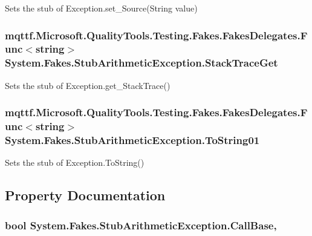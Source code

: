Sets the stub of Exception.\-set\-\_\-\-Source(\-String value)

\hypertarget{class_system_1_1_fakes_1_1_stub_arithmetic_exception_af51c42687be1226d34401b432826a1bf}{
\subsubsection[{Stack\-Trace\-Get}]{\setlength{\rightskip}{0pt plus 5cm}mqttf.\-Microsoft.\-Quality\-Tools.\-Testing.\-Fakes.\-Fakes\-Delegates.\-Func$<$string$>$ System.\-Fakes.\-Stub\-Arithmetic\-Exception.\-Stack\-Trace\-Get}}\label{class_system_1_1_fakes_1_1_stub_arithmetic_exception_af51c42687be1226d34401b432826a1bf}


Sets the stub of Exception.\-get\-\_\-\-Stack\-Trace()

\hypertarget{class_system_1_1_fakes_1_1_stub_arithmetic_exception_a7d74c548b9146bae99f26ce391132043}{
\subsubsection[{To\-String01}]{\setlength{\rightskip}{0pt plus 5cm}mqttf.\-Microsoft.\-Quality\-Tools.\-Testing.\-Fakes.\-Fakes\-Delegates.\-Func$<$string$>$ System.\-Fakes.\-Stub\-Arithmetic\-Exception.\-To\-String01}}\label{class_system_1_1_fakes_1_1_stub_arithmetic_exception_a7d74c548b9146bae99f26ce391132043}


Sets the stub of Exception.\-To\-String()



\subsection{Property Documentation}
\hypertarget{class_system_1_1_fakes_1_1_stub_arithmetic_exception_a3149e53aa5150b8806b6290e0621d1aa}{
\subsubsection[{Call\-Base}]{\setlength{\rightskip}{0pt plus 5cm}bool System.\-Fakes.\-Stub\-Arithmetic\-Exception.\-Call\-Base\hspace{0.3cm}{\ttfamily [get]}, {\ttfamily [set]}}}\label{class_system_1_1_fakes_1_1_stub_arithmetic_exception_a3149e53aa5150b8806b6290e0621d1aa}



